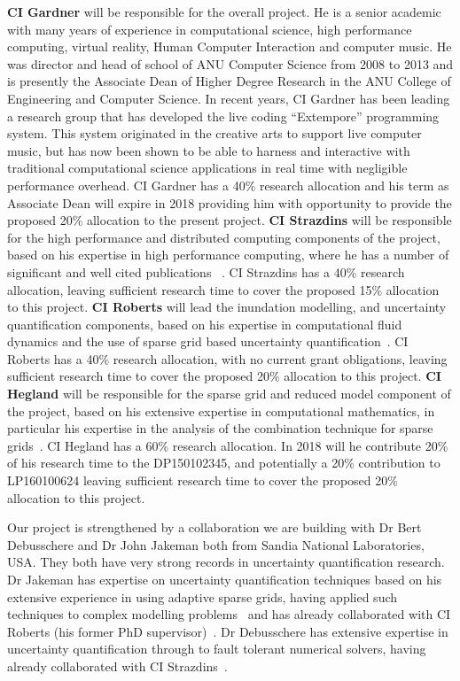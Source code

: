 {\bf CI Gardner} will be responsible for the overall project. He is a senior
academic with many years of experience in computational science, high
performance computing, virtual reality, Human Computer Interaction and
computer music. He was director and head of school of ANU Computer
Science from 2008 to 2013 and is presently the Associate Dean of
Higher Degree Research in the ANU College of Engineering and Computer
Science. In recent years, CI Gardner has been leading a research group
that has developed the live coding ``Extempore'' programming
system. This system originated in the creative arts to support live
computer music, but has now been shown to be able to harness and
interactive with traditional computational science applications in
real time with negligible performance overhead. CI Gardner has a 40\%
research allocation and his term as Associate Dean will expire in 2018
providing him with opportunity to provide the proposed 20\% allocation
to the present project.
%
{\bf CI Strazdins} will be responsible for the high performance and
distributed computing components of the project, based on his
expertise in high performance computing, where he has a number of
significant and well cited publications
~\parencite{AliEtal2015,StrazdinsEtal2015,Ali11022016}.  CI Strazdins
has a 40\% research allocation, leaving sufficient research time to
cover the proposed 15\% allocation to this project.
%
{\bf CI Roberts} will lead the inundation modelling, and uncertainty
quantification components, based on his expertise in computational
fluid dynamics and the use of sparse grid based uncertainty
quantification~\parencite{deBaarRDM2015,JakemanRoberts2013,anugamanual,nielsen2005hydrodynamic}.
CI Roberts has a 40\% research allocation, with no current grant
obligations, leaving sufficient research time to cover the proposed
20\% allocation to this project.
%
{\bf CI Hegland} will be responsible for the sparse grid and reduced
model component of the project, based on his extensive expertise in
computational mathematics, in particular his expertise in the analysis
of the combination technique for sparse
grids~\parencite{AliEtal2015,HardingHLS2015,Ali11022016}.  CI Hegland
has a 60\% research allocation. In 2018 will he contribute 20\% of his
research time to the DP150102345, and potentially a 20\% contribution
to LP160100624 leaving sufficient research time to cover the proposed
20\% allocation to this project.


Our project is strengthened by a collaboration we are building with Dr
Bert Debusschere and Dr John Jakeman both from Sandia National
Laboratories, USA. They both have very strong records in uncertainty
quantification research.  Dr Jakeman has expertise on uncertainty
quantification techniques based on his extensive experience in using
adaptive sparse grids, having applied such techniques to complex
modelling problems~\parencite{JakemanRoberts2013,jakemanNumerical2010,
  Jakeman2015} and has already collaborated with CI Roberts (his
former PhD supervisor)~\parencite{JakemanRoberts2013}.  Dr Debusschere
has extensive expertise in uncertainty quantification through to fault
tolerant numerical solvers, having already collaborated with CI
Strazdins~\parencite{parSGCT16}.  

